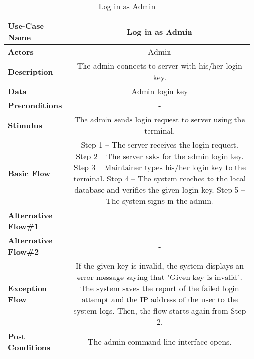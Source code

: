 \begin{table}[H]
     \centering
     \begin{tabular}{|l|C|}
         \hline
          \textbf{Use-Case Name} & Log in as Admin \\
         \hline
          \textbf{Actors} & Admin \\ 
         \hline
          \textbf{Description} & The admin connects to server with his/her login key.\\ 
         \hline
          \textbf{Data} & Admin login key\\ 
         \hline
          \textbf{Preconditions} & - \\
         \hline
          \textbf{Stimulus} & The admin sends login request to server using the terminal.\\ 
         \hline
          \textbf{Basic Flow} & 
          Step 1 -- The server receives the login request. \newline
          Step 2 -- The server asks for the admin login key. \newline
          Step 3 -- Maintainer types his/her login key to the terminal. \newline
          Step 4 -- The system reaches to the local database and verifies the given login key.   \newline
          Step 5 -- The system signs in the admin. \\
         \hline
          \textbf{Alternative Flow\#1} & - \\
         \hline
          \textbf{Alternative Flow\#2} & - \\
         \hline
          \textbf{Exception Flow} & If the given key is invalid, the system displays an error message saying that "Given key is invalid". The system saves the report of the failed login attempt and the IP address of the user to the system logs. Then, the flow starts again from Step 2. \\
         \hline
          \textbf{Post Conditions} & The admin command line interface opens. \\ 
         \hline
     \end{tabular}
     \caption{Log in as Admin}
     \label{tab:log_in_as_admin}
 \end{table}